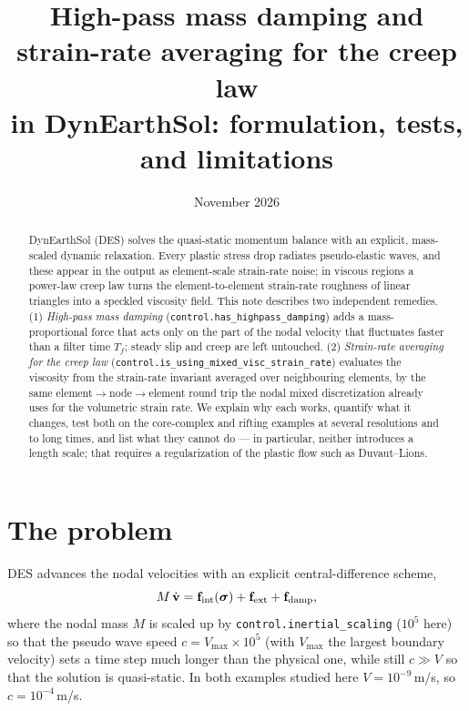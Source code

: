 \documentclass[11pt]{article}
\title{High-pass mass damping and strain-rate averaging for the creep law\\
in DynEarthSol: formulation, tests, and limitations}
\author{}
\date{November 2026}
\newcommand{\code}[1]{\texttt{#1}}
\begin{document}
\maketitle

\begin{abstract}
DynEarthSol (DES) solves the quasi-static momentum balance with an explicit, mass-scaled dynamic
relaxation. Every plastic stress drop radiates pseudo-elastic waves, and these appear in the output
as element-scale strain-rate noise; in viscous regions a power-law creep law turns the
element-to-element strain-rate roughness of linear triangles into a speckled viscosity field.
This note describes two independent remedies. (1) \emph{High-pass mass damping}
(\code{control.has\_highpass\_damping}) adds a mass-proportional force that acts only on the part
of the nodal velocity that fluctuates faster than a filter time $T_f$; steady slip and creep are
left untouched. (2) \emph{Strain-rate averaging for the creep law}
(\code{control.is\_using\_mixed\_visc\_strain\_rate}) evaluates the viscosity from the
strain-rate invariant averaged over neighbouring elements, by the same element$\to$node$\to$element
round trip the nodal mixed discretization already uses for the volumetric strain rate. We explain
why each works, quantify what it changes, test both on the core-complex and rifting examples at
several resolutions and to long times, and list what they cannot do --- in particular, neither
introduces a length scale; that requires a regularization of the plastic flow such as Duvaut--Lions.
\end{abstract}

\tableofcontents

\section{The problem}
\label{sec:problem}

DES advances the nodal velocities with an explicit central-difference scheme,
\begin{equation}
  M\,\dot{\mathbf v} = \mathbf f_{\rm int}(\boldsymbol\sigma) + \mathbf f_{\rm ext} + \mathbf f_{\rm damp},
\end{equation}
where the nodal mass $M$ is scaled up by \code{control.inertial\_scaling} ($10^5$ here) so that the
pseudo wave speed $c = V_{\max}\times10^5$ (with $V_{\max}$ the largest boundary velocity) sets a
time step much longer than the physical one, while still $c\gg V$ so that the solution is
quasi-static. In both examples studied here $V=10^{-9}$\,m/s, so $c=10^{-4}$\,m/s.
\end{document}
